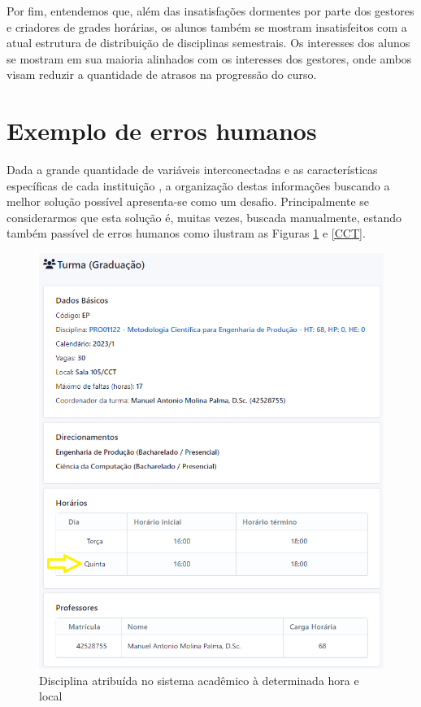 Por fim, entendemos que, além das insatisfações dormentes por parte dos gestores e criadores de grades horárias, os alunos também se mostram insatisfeitos com a atual estrutura de distribuição de disciplinas semestrais. Os interesses dos alunos se mostram em sua maioria alinhados com os interesses dos gestores, onde ambos visam reduzir a quantidade de atrasos na progressão do curso.

\section{Exemplo de erros humanos} %


Dada a grande quantidade de variáveis interconectadas e as características específicas de cada instituição \cite{miranda_udpskeduler_2012}, a organização destas informações buscando a melhor solução possível apresenta-se como um desafio. Principalmente se considerarmos que esta solução é, muitas vezes, buscada manualmente, estando também passível de erros humanos como ilustram as Figuras \ref{Academico} e \ref{CCT}.



\begin{figure}[htbp]\centering
  \caption{\label{Academico}Disciplina atribuída no sistema acadêmico à determinada hora e local}
  \includegraphics[angle=0,scale=0.8]{files/img/FalhaDeAlocacao/Metodologia-Quinta.png}
\end{figure}    %


